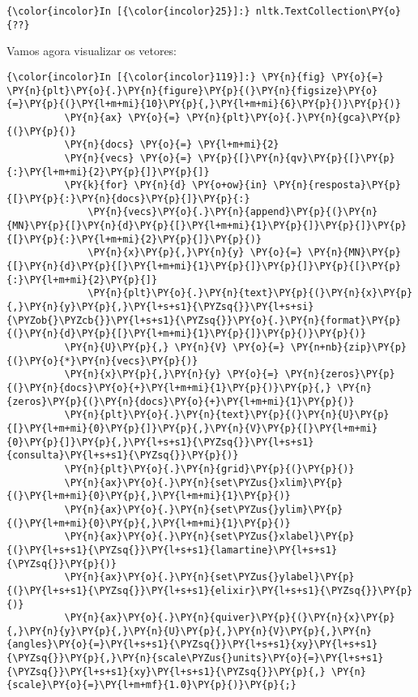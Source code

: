     \begin{Verbatim}[commandchars=\\\{\}]
{\color{incolor}In [{\color{incolor}25}]:} nltk.TextCollection\PY{o}{??}
\end{Verbatim}

    Vamos agora visualizar os vetores:

    \begin{Verbatim}[commandchars=\\\{\}]
{\color{incolor}In [{\color{incolor}119}]:} \PY{n}{fig} \PY{o}{=} \PY{n}{plt}\PY{o}{.}\PY{n}{figure}\PY{p}{(}\PY{n}{figsize}\PY{o}{=}\PY{p}{(}\PY{l+m+mi}{10}\PY{p}{,}\PY{l+m+mi}{6}\PY{p}{)}\PY{p}{)}
          \PY{n}{ax} \PY{o}{=} \PY{n}{plt}\PY{o}{.}\PY{n}{gca}\PY{p}{(}\PY{p}{)}
          \PY{n}{docs} \PY{o}{=} \PY{l+m+mi}{2}
          \PY{n}{vecs} \PY{o}{=} \PY{p}{[}\PY{n}{qv}\PY{p}{[}\PY{p}{:}\PY{l+m+mi}{2}\PY{p}{]}\PY{p}{]}
          \PY{k}{for} \PY{n}{d} \PY{o+ow}{in} \PY{n}{resposta}\PY{p}{[}\PY{p}{:}\PY{n}{docs}\PY{p}{]}\PY{p}{:}
              \PY{n}{vecs}\PY{o}{.}\PY{n}{append}\PY{p}{(}\PY{n}{MN}\PY{p}{[}\PY{n}{d}\PY{p}{[}\PY{l+m+mi}{1}\PY{p}{]}\PY{p}{]}\PY{p}{[}\PY{p}{:}\PY{l+m+mi}{2}\PY{p}{]}\PY{p}{)}
              \PY{n}{x}\PY{p}{,}\PY{n}{y} \PY{o}{=} \PY{n}{MN}\PY{p}{[}\PY{n}{d}\PY{p}{[}\PY{l+m+mi}{1}\PY{p}{]}\PY{p}{]}\PY{p}{[}\PY{p}{:}\PY{l+m+mi}{2}\PY{p}{]}
              \PY{n}{plt}\PY{o}{.}\PY{n}{text}\PY{p}{(}\PY{n}{x}\PY{p}{,}\PY{n}{y}\PY{p}{,}\PY{l+s+s1}{\PYZsq{}}\PY{l+s+si}{\PYZob{}\PYZcb{}}\PY{l+s+s1}{\PYZsq{}}\PY{o}{.}\PY{n}{format}\PY{p}{(}\PY{n}{d}\PY{p}{[}\PY{l+m+mi}{1}\PY{p}{]}\PY{p}{)}\PY{p}{)}
          \PY{n}{U}\PY{p}{,} \PY{n}{V} \PY{o}{=} \PY{n+nb}{zip}\PY{p}{(}\PY{o}{*}\PY{n}{vecs}\PY{p}{)}
          \PY{n}{x}\PY{p}{,}\PY{n}{y} \PY{o}{=} \PY{n}{zeros}\PY{p}{(}\PY{n}{docs}\PY{o}{+}\PY{l+m+mi}{1}\PY{p}{)}\PY{p}{,} \PY{n}{zeros}\PY{p}{(}\PY{n}{docs}\PY{o}{+}\PY{l+m+mi}{1}\PY{p}{)}
          \PY{n}{plt}\PY{o}{.}\PY{n}{text}\PY{p}{(}\PY{n}{U}\PY{p}{[}\PY{l+m+mi}{0}\PY{p}{]}\PY{p}{,}\PY{n}{V}\PY{p}{[}\PY{l+m+mi}{0}\PY{p}{]}\PY{p}{,}\PY{l+s+s1}{\PYZsq{}}\PY{l+s+s1}{consulta}\PY{l+s+s1}{\PYZsq{}}\PY{p}{)}
          \PY{n}{plt}\PY{o}{.}\PY{n}{grid}\PY{p}{(}\PY{p}{)}
          \PY{n}{ax}\PY{o}{.}\PY{n}{set\PYZus{}xlim}\PY{p}{(}\PY{l+m+mi}{0}\PY{p}{,}\PY{l+m+mi}{1}\PY{p}{)}
          \PY{n}{ax}\PY{o}{.}\PY{n}{set\PYZus{}ylim}\PY{p}{(}\PY{l+m+mi}{0}\PY{p}{,}\PY{l+m+mi}{1}\PY{p}{)}
          \PY{n}{ax}\PY{o}{.}\PY{n}{set\PYZus{}xlabel}\PY{p}{(}\PY{l+s+s1}{\PYZsq{}}\PY{l+s+s1}{lamartine}\PY{l+s+s1}{\PYZsq{}}\PY{p}{)}
          \PY{n}{ax}\PY{o}{.}\PY{n}{set\PYZus{}ylabel}\PY{p}{(}\PY{l+s+s1}{\PYZsq{}}\PY{l+s+s1}{elixir}\PY{l+s+s1}{\PYZsq{}}\PY{p}{)}
          \PY{n}{ax}\PY{o}{.}\PY{n}{quiver}\PY{p}{(}\PY{n}{x}\PY{p}{,}\PY{n}{y}\PY{p}{,}\PY{n}{U}\PY{p}{,}\PY{n}{V}\PY{p}{,}\PY{n}{angles}\PY{o}{=}\PY{l+s+s1}{\PYZsq{}}\PY{l+s+s1}{xy}\PY{l+s+s1}{\PYZsq{}}\PY{p}{,}\PY{n}{scale\PYZus{}units}\PY{o}{=}\PY{l+s+s1}{\PYZsq{}}\PY{l+s+s1}{xy}\PY{l+s+s1}{\PYZsq{}}\PY{p}{,} \PY{n}{scale}\PY{o}{=}\PY{l+m+mf}{1.0}\PY{p}{)}\PY{p}{;}
\end{Verbatim}


